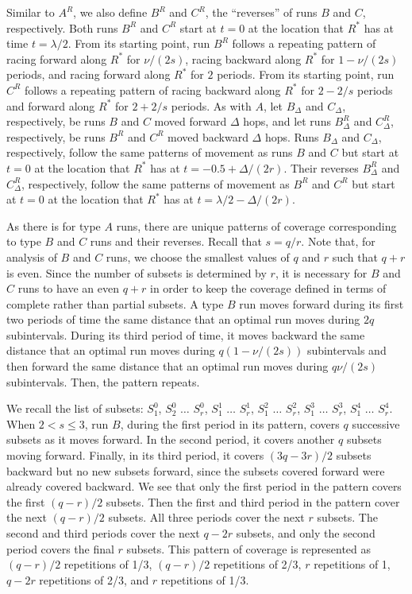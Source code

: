 \documentclass[11pt]{article}
\begin{document}
Similar to $A^R$, we also define $B^R$ and $C^R$, the ``reverses'' of runs $B$ and $C$, respectively.  Both runs $B^R$ and $C^R$ start at $t = 0$ at the location that $R^*$ has at time $t = \lambda/2$.  From its starting point, run $B^R$ follows a repeating pattern of racing forward along $R^*$ for $\nu/(2s)$, racing backward along $R^*$ for $1 - \nu/(2s)$ periods, and racing forward along $R^*$ for $2$ periods.  From its starting point, run $C^R$ follows a repeating pattern of racing backward along $R^*$ for $2 - 2/s$ periods and forward along $R^*$ for $2 + 2/s$ periods.  As with $A$, let $B_\Delta$ and $C_\Delta$, respectively, be runs $B$ and $C$ moved forward $\Delta$ hops, and let runs $B_\Delta^R$ and $C_\Delta^R$, respectively, be runs $B^R$ and $C^R$ moved backward $\Delta$ hops.  Runs $B_\Delta$ and $C_\Delta$, respectively, follow the same patterns of movement as runs $B$ and $C$ but start at $t = 0$ at the location that $R^*$ has at  $t = -0.5 + \Delta/(2r)$.  Their reverses $B_\Delta^R$ and $C_\Delta^R$, respectively, follow the same patterns of movement as $B^R$ and $C^R$ but start at $t = 0$ at the location that $R^*$ has at $t = \lambda/2 - \Delta/(2r)$.

As there is for type $A$ runs, there are unique patterns of coverage corresponding to type $B$ and $C$ runs and their reverses.   Recall that $s = q/r$.  Note that, for analysis of $B$ and $C$ runs, we choose the smallest values of $q$ and $r$ such that $q + r$ is even.  Since the number of subsets is determined by $r$, it is necessary for $B$ and $C$ runs to have an even $q + r$ in order to keep the coverage defined in terms of complete rather than partial subsets.  A type $B$ run moves forward during its first two periods of time the same distance that an optimal run moves during $2q$ subintervals.  During its third period of time, it moves backward the same distance that an optimal run moves during $q( 1 - \nu/(2s))$ subintervals and then forward the same distance that an optimal run moves during $q\nu/(2s)$ subintervals.  Then, the pattern repeats.

We recall the list of subsets: $S^0_1$, $S^0_2$ $\ldots$ $S^0_r$, $S^1_1$ $\ldots$ $S^1_r$, $S^2_1$ $\ldots$ $S^2_r$, $S^3_1$ $\ldots$ $S^3_r$, $S^4_1$ $\ldots$ $S^4_r$.
When $2 < s \leq 3$, run $B$, during the first period in its pattern, covers $q$ successive subsets as it moves forward.  In the second period, it covers another $q$ subsets moving forward.  Finally, in its third period, it covers $(3q - 3r)/2$ subsets backward but no new subsets forward, since the subsets covered forward were already covered backward.    We see that only the first period in the pattern covers the first $(q - r)/2$ subsets.  Then the first and third period in the pattern cover the next $(q - r)/2$ subsets.  All three periods cover the next $r$ subsets.  The second and third periods cover the next $q - 2r$ subsets, and only the second period covers the final $r$ subsets.  This pattern of coverage is represented as $(q - r)/2$ repetitions of 1/3, $(q - r)/2$ repetitions of 2/3, $r$ repetitions of 1, $q - 2r$ repetitions of 2/3, and $r$ repetitions of 1/3.
\end{document}
